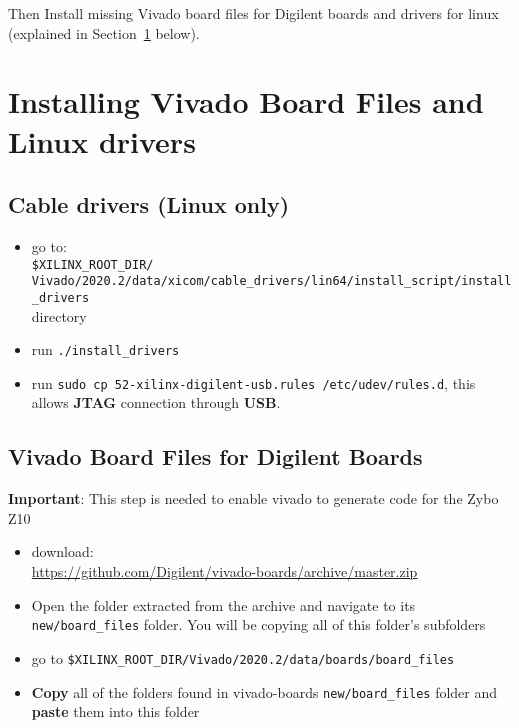 Then Install missing Vivado board files for Digilent boards and drivers for linux (explained in Section~\ref{board-file-install} below).





\section{Installing Vivado Board Files and Linux drivers}
\label{board-file-install}

\subsection{Cable drivers (Linux only)}
\label{sec-udev}
\begin{itemize}
\item
  go to:\\
  \texttt{\$XILINX\_ROOT\_DIR/}\\
  \texttt{Vivado/2020.2/data/xicom/cable\_drivers/lin64/install\_script/install\_drivers}\\
  directory
\item
  run \texttt{./install\_drivers}
\item
  run \texttt{sudo\ cp\ 52-xilinx-digilent-usb.rules\ /etc/udev/rules.d}, this
  allows \textbf{JTAG} connection through \textbf{USB}.
\end{itemize}

\subsection{Vivado Board Files for Digilent Boards}
{\bf Important}: This step is needed to enable vivado to generate code for the Zybo Z10

\begin{itemize}
\item
  download:\\
\href{https://github.com/Digilent/vivado-boards/archive/master.zip?\_ga=2.76732885.1953828090.1655988025-1125947215.1655988024}{https://github.com/Digilent/vivado-boards/archive/master.zip}
\item
  Open the folder extracted from the archive and navigate to its
  \texttt{new/board\_files} folder. You will be copying all of this
  folder's subfolders
\item
  go to
  \texttt{\$XILINX\_ROOT\_DIR/Vivado/2020.2/data/boards/board\_files}
\item
  \textbf{Copy} all of the folders found in vivado-boards
  \texttt{new/board\_files} folder and \textbf{paste} them into this
  folder
\end{itemize}

